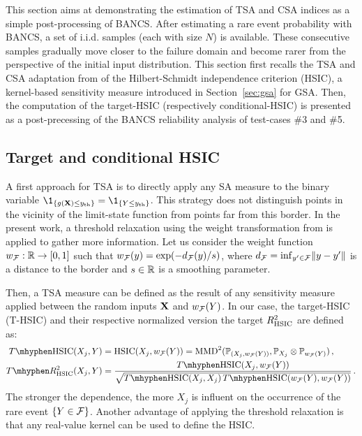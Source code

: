 This section aims at demonstrating the estimation of TSA and CSA indices as a simple post-processing of BANCS. 
After estimating a rare event probability with BANCS, a set of i.i.d. samples (each with size $N$) is available. 
These consecutive samples gradually move closer to the failure domain and become rarer from the perspective of the initial input distribution. 
This section first recalls the TSA and CSA adaptation from \citet{marrel_chabridon_2021} of the Hilbert-Schmidt independence criterion (HSIC), a kernel-based sensitivity measure introduced in Section~\ref{sec:gsa} for GSA.
Then, the computation of the target-HSIC (respectively conditional-HSIC) is presented as a post-precessing of the BANCS reliability analysis of test-cases \#3 and \#5. 


\subsection{Target and conditional HSIC}

A first approach for TSA is to directly apply any SA measure to the binary variable $\1_{\{g(\bX) \leq \yth\}} = \1_{\{Y \leq \yth\}}$. 
This strategy does not distinguish points in the vicinity of the limit-state function from points far from this border. 
In the present work, a threshold relaxation using the weight transformation from \citet{marrel_chabridon_2021} is applied to gather more information. 
Let us consider the weight function $w_{\mathcal{F}}: \mathbb{R} \rightarrow [0, 1]$ such that $w_{\mathcal{F}}(y) = \exp(-d_{\mathcal{F}}(y)/s)$, where $d_{\mathcal{F}} = \mathrm{inf}_{y'\in \mathcal{F}} \Vert y -y' \Vert$ is a distance to the border and $s\in\mathbb{R}$ is a smoothing parameter. 

Then, a TSA measure can be defined as the result of any sensitivity measure applied between the random inputs ${\bf X}$ and $w_{\mathcal{F}}(Y)$. 
In our case, the target-HSIC (T-HSIC) and their respective normalized version the target $R^2_{\mathrm{HSIC}}$ are defined as: 
\begin{subequations}
    \begin{align}
        T \mhyphen \HSIC(X_j, Y) & = \HSIC(X_j, w_{\iF}(Y)) = \MMD^2(\P_{(X_j, w_{\iF}(Y))}, \P_{X_j} \otimes \P_{w_{\iF}(Y)})\, ,\\
        T \mhyphen R^2_{\HSIC}(X_j, Y) &= \frac{T \mhyphen \HSIC(X_j, w_{\iF}(Y))}{\sqrt{T \mhyphen \HSIC(X_j, X_j) \, T \mhyphen \HSIC(w_{\iF}(Y), w_{\iF}(Y))}}\, .
    \end{align}
\end{subequations}
The stronger the dependence, the more $X_j$ is influent on the occurrence of the rare event $\{Y\in\mathcal{F}\}$.  
Another advantage of applying the threshold relaxation is that any real-value kernel can be used to define the HSIC. 


